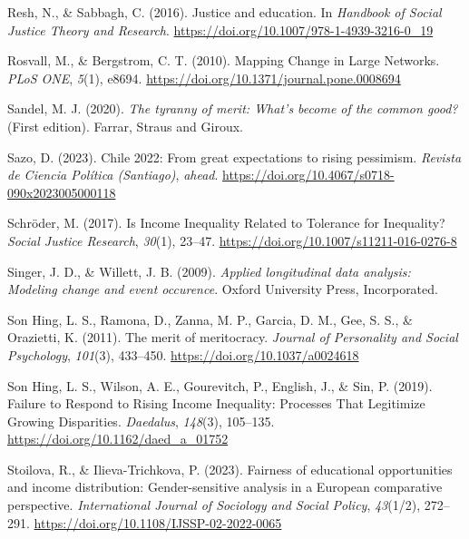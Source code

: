 \documentclass[
  12pt,
  a4paper,
]{article}
\newlength{\cslhangindent}
\newlength{\cslentryspacingunit} %
\newenvironment{CSLReferences}[2] %
 {%
  \setlength{\parindent}{0pt}
  \ifodd #1
  \let\oldpar\par
  \def\par{\hangindent=\cslhangindent\oldpar}
  \fi
  \setlength{\parskip}{#2\cslentryspacingunit}
 }%
 {}
\begin{document}
\begin{CSLReferences}{1}{0}
\leavevmode{}%
Resh, N., \& Sabbagh, C. (2016). Justice and education. In
\emph{Handbook of Social Justice Theory and Research}.
\url{https://doi.org/10.1007/978-1-4939-3216-0_19}

\leavevmode{}%
Rosvall, M., \& Bergstrom, C. T. (2010). Mapping {Change} in {Large
Networks}. \emph{PLoS ONE}, \emph{5}(1), e8694.
\url{https://doi.org/10.1371/journal.pone.0008694}

\leavevmode{}%
Sandel, M. J. (2020). \emph{The tyranny of merit: {What}'s become of the
common good?} (First edition). {Farrar, Straus and Giroux}.

\leavevmode{}%
Sazo, D. (2023). Chile 2022: {From} great expectations to rising
pessimism. \emph{Revista de Ciencia Pol{í}tica (Santiago)},
\emph{ahead}. \url{https://doi.org/10.4067/s0718-090x2023005000118}

\leavevmode{}%
Schröder, M. (2017). Is {Income Inequality Related} to {Tolerance} for
{Inequality}? \emph{Social Justice Research}, \emph{30}(1), 23--47.
\url{https://doi.org/10.1007/s11211-016-0276-8}

\leavevmode{}%
Singer, J. D., \& Willett, J. B. (2009). \emph{Applied longitudinal data
analysis: Modeling change and event occurence}. Oxford University Press,
Incorporated.

\leavevmode{}%
Son Hing, L. S., Ramona, D., Zanna, M. P., Garcia, D. M., Gee, S. S., \&
Orazietti, K. (2011). The merit of meritocracy. \emph{Journal of
Personality and Social Psychology}, \emph{101}(3), 433--450.
\url{https://doi.org/10.1037/a0024618}

\leavevmode{}%
Son Hing, L. S., Wilson, A. E., Gourevitch, P., English, J., \& Sin, P.
(2019). Failure to {Respond} to {Rising Income Inequality}: {Processes
That Legitimize Growing Disparities}. \emph{Daedalus}, \emph{148}(3),
105--135. \url{https://doi.org/10.1162/daed_a_01752}

\leavevmode{}%
Stoilova, R., \& Ilieva-Trichkova, P. (2023). Fairness of educational
opportunities and income distribution: Gender-sensitive analysis in a
{European} comparative perspective. \emph{International Journal of
Sociology and Social Policy}, \emph{43}(1/2), 272--291.
\url{https://doi.org/10.1108/IJSSP-02-2022-0065}


\end{CSLReferences}
\end{document}
